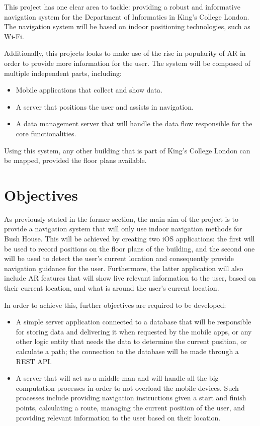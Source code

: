 This project has one clear area to tackle: providing a robust and informative navigation system for the Department of Informatics in King's College London. The navigation system will be based on indoor positioning technologies, such as Wi-Fi.

Additionally, this projects looks to make use of the rise in popularity of AR in order to provide more information for the user. The system will be composed of multiple independent parts, including:
\begin{itemize}
    \item Mobile applications that collect and show data.
    \item A server that positions the user and assists in navigation.
    \item A data management server that will handle the data flow responsible for the core functionalities.
\end{itemize}

Using this system, any other building that is part of King's College London can be mapped, provided the floor plans available.

\section{Objectives}
\label{sec:objectives}

As previously stated in the former section, the main aim of the project is to provide a navigation system that will only use indoor navigation methods for Bush House. This will be achieved by creating two iOS applications: the first will be used to record positions on the floor plans of the building, and the second one will be used to detect the user's current location and consequently provide navigation guidance for the user. Furthermore, the latter application will also include AR features that will show live relevant information to the user, based on their current location, and what is around the user's current location.

In order to achieve this, further objectives are required to be developed:
\begin{itemize}
    \item A simple server application connected to a database that will be responsible for storing data and delivering it when requested by the mobile apps, or any other logic entity that needs the data to determine the current position, or calculate a path; the connection to the database will be made through a REST API.
    \item A server that will act as a middle man and will handle all the big computation processes in order to not overload the mobile devices. Such processes include providing navigation instructions given a start and finish points, calculating a route, managing the current position of the user, and providing relevant information to the user based on their location.
\end{itemize}